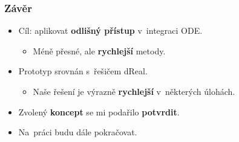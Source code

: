 \documentclass[t]{beamer}
\newcommand{\picFn}[1]{../img/#1}
\newcommand{\picL}{pic}
\newcommand{\pic}[3]{
\begin{figure}
\centering
\texttt{[image: \\picFn\{\#1]}}
\label{\picL:#2}
\end{figure}
}
\begin{document}



\begin{frame}\frametitle{Závěr}
\begin{itemize}
\item Cíl: aplikovat \textbf{odlišný přístup} v~integraci ODE.
   \begin{itemize}
   \item Méně přesné, ale \textbf{rychlejší} metody.
   \end{itemize}
\item Prototyp srovnán s~řešičem dReal.
   \begin{itemize}
   \item Naše řešení je výrazně \textbf{rychlejší} v~některých úlohách.
   \end{itemize}
\item Zvolený \textbf{koncept} se mi podařilo \textbf{potvrdit}.
\item Na~práci budu dále pokračovat.
\end{itemize}
\end{frame}


\appendix
{}
\setcounter{finalframe}{\value{framenumber}}
\end{document}
